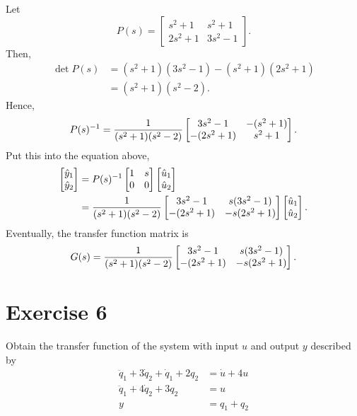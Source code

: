 \documentclass[12pt,a4paper]{article}
\begin{document}
Let
\[
P(s)=\begin{bmatrix}
s^2+1 & s^2+1 \\
2s^2+1 & 3s^2-1
\end{bmatrix}.
\]
Then,
\[
\begin{aligned}
\det P(s)
&=(s^2+1)(3s^2-1)-(s^2+1)(2s^2+1)\\
&=(s^2+1)(s^2-2).
\end{aligned}
\]
Hence,
\[
P(s)^{-1}={1\over (s^2+1)(s^2-2)}
\begin{bmatrix}
3s^2-1 & -(s^2+1) \\
-(2s^2+1) & s^2+1
\end{bmatrix}.
\]
Put this into the equation above,
\begin{align*}
\begin{bmatrix}\hat y_1\\\hat y_2\end{bmatrix}
&=P(s)^{-1}\begin{bmatrix}1&s\\0&0\end{bmatrix}
\begin{bmatrix}\hat u_1\\\hat u_2\end{bmatrix}\\
&={1\over (s^2+1)(s^2-2)}
\begin{bmatrix}
3s^2-1 & s(3s^2-1)\\
-(2s^2+1) & -s(2s^2+1)
\end{bmatrix}
\begin{bmatrix}\hat u_1\\\hat u_2\end{bmatrix}.
\end{align*}
Eventually, the transfer function matrix is
\[
G(s)={1\over (s^2+1)(s^2-2)}
\begin{bmatrix}
3s^2-1 & s(3s^2-1)\\
-(2s^2+1) & -s(2s^2+1)
\end{bmatrix}.
\]

\section*{Exercise 6}
Obtain the transfer function of the system with input $u$ and output $y$ described by
\[
\begin{aligned}
\ddot q_1+3\dot q_2+\dot q_1+2q_2 &= \dot u+4u\\
\ddot q_1+4\dot q_2+3q_2 &= u\\
y &= q_1+q_2
\end{aligned}
\]
\end{document}
